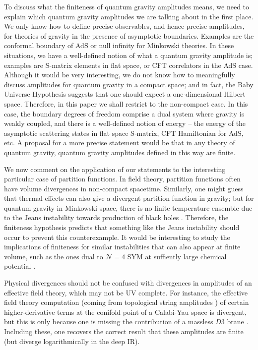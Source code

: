 \documentclass[11pt]{article}
\numberwithin{equation}{section}
\numberwithin{equation}{section}
\theoremstyle{remark}
\begin{document}
To discuss what the finiteness of quantum gravity amplitudes means, we need to explain which quantum gravity amplitudes we are talking about in the first place. We only know how to define precise observables, and hence precise amplitudes, for theories of gravity in the presence of asymptotic boundaries. Examples are the conformal boundary of AdS or null infinity for Minkowski theories. In these situations, we have a well-defined notion of what a quantum gravity amplitude is; examples are S-matrix elements in flat space, or CFT correlators in the AdS case. Although it would be very interesting, we do not know how to meaningfully discuss amplitudes for quantum gravity in a compact space; and in fact, the Baby Universe Hypothesis \cite{McNamara:2020uza} suggests that one should expect a one-dimensional Hilbert space. Therefore, in this paper we shall restrict to the non-compact case. In this case, the boundary degrees of freedom comprise a dual system where gravity is weakly coupled, and there is a well-defined notion of energy -- the energy of the asymptotic scattering states in flat space S-matrix, CFT Hamiltonian for AdS, etc. 
A proposal for a more precise statement would be that in any theory of quantum gravity, quantum gravity amplitudes defined in this way are finite.


We now comment on the application of our statements to the interesting particular case of partition functions. In field theory, partition functions often have volume divergences in non-compact spacetime. Similarly, one might guess that thermal effects can also give a divergent partition function in gravity; but for quantum gravity in Minkowski space, there is no finite temperature ensemble due to the Jeans instability towards production of black holes \cite{Gross:1981mg}. Therefore, the finiteness hypothesis predicts that something like the Jeans instability should occur to prevent this counterexample. It would be interesting to study the implications of finiteness for similar instabilities that can also appear at finite volume, such as the ones dual to $\mathcal{N}=4$
 SYM at suffiently large chemical potential \cite{Hollowood:2008gp}.

 
Physical divergences should not be confused with divergences in amplitudes of an effective field theory, which may not be UV complete. For instance, the effective field theory computation (coming from topological string amplitudes \cite{Bershadsky:1993cx,Bershadsky:1993ta}) of certain higher-derivative terms at  the conifold point of a Calabi-Yau space is divergent, but this is only because one is missing the contribution of a massless $D3$ brane \cite{Strominger:1995cz}. Including these, one recovers the correct result that these amplitudes are finite (but diverge logarithmically in the deep IR).
\end{document}
